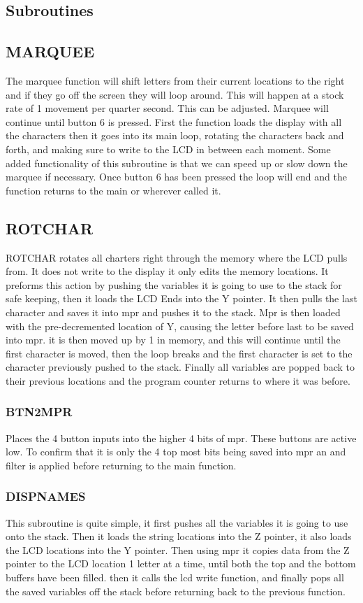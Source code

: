 \documentclass[12pt,letterpaper]{article}
\begin{document}
\subsection{Subroutines}
	\subsection{MARQUEE}
	The marquee function will shift letters from their current locations to the right and if they go off the screen they will loop around. This will happen at a stock rate of 1 movement per quarter second. This can be adjusted. Marquee will continue until button 6 is pressed. First the function loads the display with all the characters then it goes into its main loop, rotating the characters back and forth, and making sure to write to the LCD in between each moment. Some added functionality of this subroutine is that we can speed up or slow down the marquee if necessary. Once button 6 has been pressed the loop will end and the function returns to the main or wherever called it. 
	
	\subsection{ROTCHAR}
	ROTCHAR rotates all charters right through the memory where the LCD pulls from. It does not write to the display it only edits the memory locations. It preforms this action by pushing the variables it is going to use to the stack for safe keeping, then it loads the LCD Ends into the Y pointer. It then pulls the last character and saves it into mpr and pushes it to the stack. Mpr is then loaded with the pre-decremented location of Y, causing the letter before last to be saved into mpr. it is then moved up by 1 in memory, and this will continue until the first character is moved, then the loop breaks and the first character is set to the character previously pushed to the stack. Finally all variables are popped back to their previous locations and the program counter returns to where it was before.  


	\subsubsection{BTN2MPR}
	Places the 4 button inputs into the higher 4 bits of mpr. These buttons are active low. To confirm that it is only the 4 top most bits being saved into mpr an and filter is applied before returning to the main function. 
	
	\subsubsection{DISPNAMES}
	This subroutine is quite simple, it first pushes all the variables it is going to use onto the stack. Then it loads the string locations into the Z pointer, it also loads the LCD locations into the Y pointer. Then using mpr it copies data from the Z pointer to the LCD location 1 letter at a time, until both the top and the bottom buffers have been filled. then it calls the lcd write function, and finally pops all the saved variables off the stack before returning back to the previous function. 
	
\end{document}
